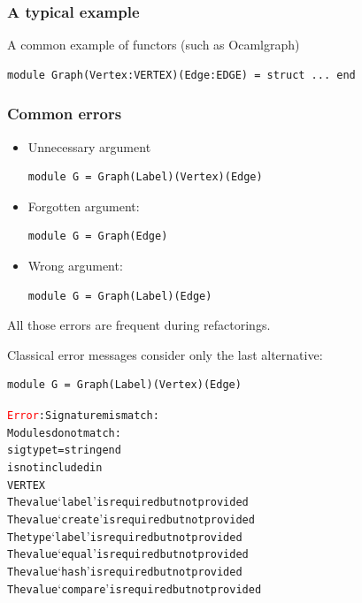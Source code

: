 \documentclass[11pt,aspectratio=169]{beamer}
\newcommand{\error}[1]{\textcolor{red}{#1}}
\begin{document}
\begin{frame}[fragile]\frametitle{A typical example}
A common example of functors (such as Ocamlgraph)
\begin{verbatim}
module Graph(Vertex:VERTEX)(Edge:EDGE) = struct ... end
\end{verbatim}


\end{frame}

\begin{frame}[fragile]\frametitle{Common errors}

  \begin{itemize}
    \item{Unnecessary argument
\begin{verbatim}
module G = Graph(Label)(Vertex)(Edge)
\end{verbatim}
      }
    \item{Forgotten argument:
\begin{verbatim}
module G = Graph(Edge)
\end{verbatim}
      }
    \item{Wrong argument:
\begin{verbatim}
module G = Graph(Label)(Edge)
\end{verbatim}
      }
\end{itemize}

All those errors are frequent during refactorings.

\end{frame}

\begin{frame}[fragile]
Classical error messages consider only the last alternative:

\begin{verbatim}
module G = Graph(Label)(Vertex)(Edge)
\end{verbatim}

\begin{alltt}
\error{Error}: Signature mismatch:
       Modules do not match:
         sig type t = string end
       is not included in
         VERTEX
       The value `label' is required but not provided
       The value `create' is required but not provided
       The type `label' is required but not provided
       The value `equal' is required but not provided
       The value `hash' is required but not provided
       The value `compare' is required but not provided
 \end{alltt}
\end{frame}
\end{document}

